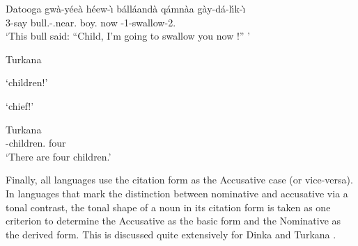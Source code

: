 \begin{exe}
\ex\label{DatVoc} {Datooga}  \citep[171]{Kiessling:2007}\nopagebreak[4]
\gll gw\`a-y\'ee\textesh\`a h\'eew-\`\i{} b\'all\'aand\`a q\'amn\`aa g\`ay-d\'a-l\'\i k-\textltailn\`\i\\
3\sg{}-say bull.\nom{}-\dem{}.near.\sg{} boy.\acc{} now \fut{}-1\sg{}-swallow-2\sg{}.\obj{}\\
`This bull said: ``Child, I'm going to swallow you now !'' '
\end{exe}


\begin{exe}\ex\label{TurVoc} {Turkana} \citep[268, 269]{Dimmendaal:1982}\nopagebreak[4]
\begin{xlist}
\ex{} `children!'

\ex{}	`chief!'
\end{xlist}
\end{exe}

\begin{exe}
\ex\label{TurNonVoc} {Turkana} \citep[75]{Dimmendaal:1982}\nopagebreak[4]
\gll{} \\
\NC{}-children.\acc{} four\\
`There are four children.' %
\end{exe}

Finally, all languages use the citation form as the Accusative case (or vice-versa).
In languages that mark the distinction between nominative and accusative via a tonal contrast, the tonal shape of a noun in its citation form is taken as one criterion to determine the Accusative as the basic form and the Nominative as the derived form.
This is discussed quite extensively for Dinka \citep[273]{Andersen:1991} and Turkana \citep[66]{Dimmendaal:1982}.



